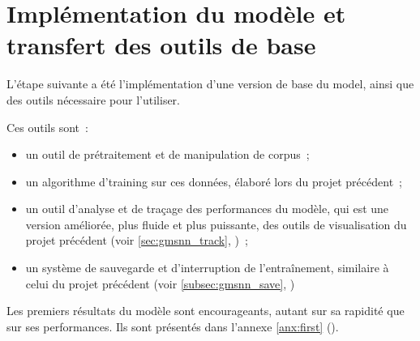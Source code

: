\section{Implémentation du modèle et transfert des outils de base}
L'étape suivante a été l'implémentation d'une version de base du \gls{model}, ainsi que des outils nécessaire pour l'utiliser.

Ces outils sont~:
\begin{itemize}
	\item un outil de prétraitement et de manipulation de \gls{corpus}~;
	\item un algorithme d'\gls{training} sur ces données, élaboré lors du projet précédent~;
	\item un outil d'analyse et de traçage des performances du modèle, qui est une version améliorée, plus fluide et plus puissante, des outils de visualisation du projet précédent (voir \autoref{sec:gmsnn_track}, )~;
	\item un système de sauvegarde et d'interruption de l'entraînement, similaire à celui du projet précédent (voir \autoref{subsec:gmsnn_save}, )
\end{itemize}
\vspace{1em}

Les premiers résultats du modèle sont encourageants, autant sur sa rapidité que sur ses performances.
Ils sont présentés dans l'annexe \ref{anx:first} ().
